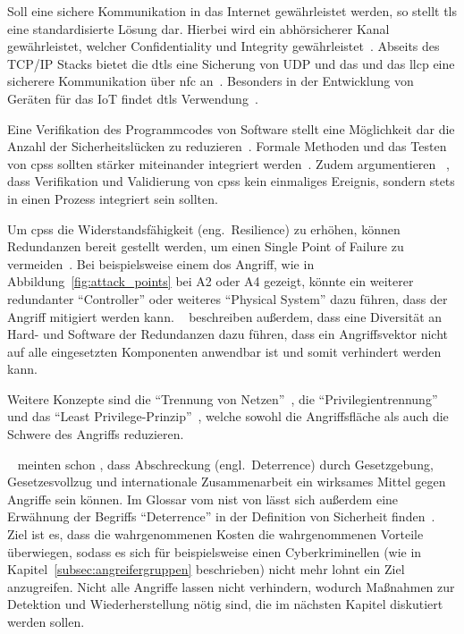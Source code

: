 \documentclass[final,bibliography=totocnumbered]{include/sikseminar}
\newcommand{\cps}{\glspl{cps}\xspace}
\begin{document}

    Soll eine sichere Kommunikation in das Internet gewährleistet werden, so stellt \gls{tls} eine standardisierte Lösung dar.
    Hierbei wird ein abhörsicherer Kanal gewährleistet, welcher Confidentiality und Integrity gewährleistet~\cite{SPB+16}.
   Abseits des TCP/IP Stacks bietet die \acrlong{dtls} eine Sicherung von UDP und das und das \acrlong{llcp} eine sicherere Kommunikation über \acrlong{nfc} an~\cite{SPB+16}.
    Besonders in der Entwicklung von Geräten für das IoT findet \gls{dtls} Verwendung~\cite{YWY+17,FPA+18}.


    Eine Verifikation des Programmcodes von Software stellt eine Möglichkeit dar die Anzahl der Sicherheitslücken zu reduzieren~\cite{CAS08}.
    Formale Methoden und das Testen von \cps sollten stärker miteinander integriert werden~\cite{RLS+10}.
    Zudem argumentieren \citeauthor{SGL+08}~\cite{SGL+08}, dass Verifikation und Validierung von \cps kein einmaliges Ereignis, sondern stets in einen Prozess integriert sein sollten.


    Um \cps die Widerstandsfähigkeit (eng.\ Resilience) zu erhöhen, können Redundanzen bereit gestellt werden, um einen Single Point of Failure zu vermeiden~\cite{CAS+09}.
    Bei beispielsweise einem \gls{dos} Angriff, wie in Abbildung~\ref{fig:attack_points} bei A2 oder A4 gezeigt, könnte ein weiterer redundanter \enquote{Controller} oder weiteres \enquote{Physical System} dazu führen, dass der Angriff mitigiert werden kann.
    \citeauthor{CAS+09}~\cite{CAS+09} beschreiben außerdem, dass eine Diversität an Hard- und Software der Redundanzen dazu führen, dass ein Angriffsvektor nicht auf alle eingesetzten Komponenten anwendbar ist und somit verhindert werden kann.


    Weitere Konzepte sind die \enquote{Trennung von Netzen}~\cite{GK16}, die \enquote{Privilegientrennung} und das \enquote{Least Privilege-Prinzip}~\cite{CAS+09}, welche sowohl die Angriffsfläche als auch die Schwere des Angriffs reduzieren.

    \citeauthor{CAS+09}~\cite{CAS+09} meinten schon \citeyear{CAS+09}, dass Abschreckung (engl.\ Deterrence) durch Gesetzgebung, Gesetzesvollzug und internationale Zusammenarbeit ein wirksames Mittel gegen Angriffe sein können.
    Im Glossar vom \gls{nist} von \citeyear{Kissel13} lässt sich außerdem eine Erwähnung der Begriffs \enquote{Deterrence} in der Definition von Sicherheit finden~\cite{Kissel13}.
    Ziel ist es, dass die wahrgenommenen Kosten die wahrgenommenen Vorteile überwiegen, sodass es sich für beispielsweise einen Cyberkriminellen (wie in Kapitel~\ref{subsec:angreifergruppen} beschrieben) nicht mehr lohnt ein Ziel anzugreifen.
    Nicht alle Angriffe lassen nicht verhindern, wodurch Maßnahmen zur Detektion und Wiederherstellung nötig sind, die im nächsten Kapitel diskutiert werden sollen.
\end{document}
